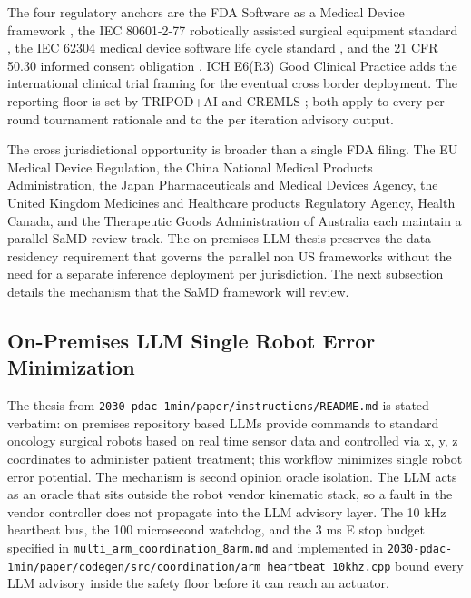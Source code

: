 The four regulatory anchors are the FDA Software as a Medical
Device framework \cite{fda-samd}, the IEC 80601-2-77 robotically
assisted surgical equipment standard \cite{iec-80601-2-77}, the
IEC 62304 medical device software life cycle standard
\cite{iec-62304}, and the 21 CFR 50.30 informed consent obligation
\cite{cfr-21-50-30}. ICH E6(R3) Good Clinical Practice
\cite{ich-e6r3} adds the international clinical trial framing for
the eventual cross border deployment. The reporting floor is set
by TRIPOD+AI \cite{Collins2024TRIPODAI} and CREMLS
\cite{ElEmam2024CREMLS}; both apply to every per round tournament
rationale and to the per iteration advisory output.

The cross jurisdictional opportunity is broader than a single FDA
filing. The EU Medical Device Regulation, the China National
Medical Products Administration, the Japan Pharmaceuticals and
Medical Devices Agency, the United Kingdom Medicines and Healthcare
products Regulatory Agency, Health Canada, and the Therapeutic
Goods Administration of Australia each maintain a parallel SaMD
review track. The on premises LLM thesis preserves the data
residency requirement that governs the parallel non US frameworks
without the need for a separate inference deployment per
jurisdiction. The next subsection details the mechanism
that the SaMD framework will review.

\subsection{On-Premises LLM Single Robot Error Minimization}
\label{sec:discussion-onprem}

The thesis from
\texttt{2030-pdac-1min/paper/instructions/README.md} is stated
verbatim: on premises repository based LLMs provide commands to
standard oncology surgical robots based on real time sensor data
and controlled via x, y, z coordinates to administer patient
treatment; this workflow minimizes single robot error potential.
The mechanism is second opinion oracle isolation. The LLM acts as
an oracle that sits outside the robot vendor kinematic stack, so a
fault in the vendor controller does not propagate into the LLM
advisory layer. The 10 kHz heartbeat bus, the 100 microsecond
watchdog, and the 3 ms E stop budget specified in
\texttt{multi_arm_coordination_8arm.md} and implemented in
\texttt{2030-pdac-1min/paper/codegen/src/coordination/arm_heartbeat_10khz.cpp}
bound every LLM advisory inside the safety floor before it can
reach an actuator.

